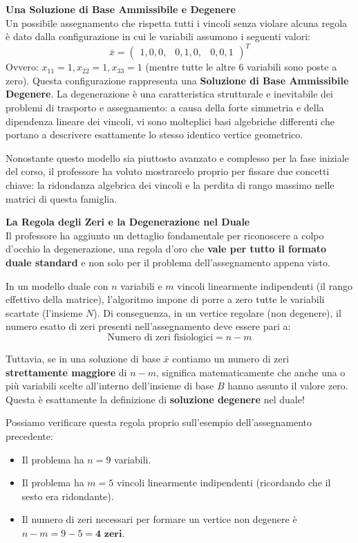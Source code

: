 \documentclass[12pt, a4paper]{article}
\begin{document}
	\vspace{0.3cm}
	\textbf{Una Soluzione di Base Ammissibile e Degenere}\\
	Un possibile assegnamento che rispetta tutti i vincoli senza violare alcuna regola è dato dalla configurazione in cui le variabili assumono i seguenti valori:
	\[
	\bar{x} = \begin{pmatrix} 1, 0, 0, & 0, 1, 0, & 0, 0, 1 \end{pmatrix}^T
	\]
	Ovvero: $x_{11}=1, x_{22}=1, x_{33}=1$ (mentre tutte le altre 6 variabili sono poste a zero).
	Questa configurazione rappresenta una \textbf{Soluzione di Base Ammissibile Degenere}. La degenerazione è una caratteristica strutturale e inevitabile dei problemi di trasporto e assegnamento: a causa della forte simmetria e della dipendenza lineare dei vincoli, vi sono molteplici basi algebriche differenti che portano a descrivere esattamente lo stesso identico vertice geometrico.
	
	Nonostante questo modello sia piuttosto avanzato e complesso per la fase iniziale del corso, il professore ha voluto mostrarcelo proprio per fissare due concetti chiave: la ridondanza algebrica dei vincoli e la perdita di rango massimo nelle matrici di questa famiglia.
	
	\vspace{0.4cm}
	\textbf{La Regola degli Zeri e la Degenerazione nel Duale}\\
	Il professore ha aggiunto un dettaglio fondamentale per riconoscere a colpo d'occhio la degenerazione, una regola d'oro che \textbf{vale per tutto il formato duale standard} e non solo per il problema dell'assegnamento appena visto.
	
	In un modello duale con $n$ variabili e $m$ vincoli linearmente indipendenti (il rango effettivo della matrice), l'algoritmo impone di porre a zero tutte le variabili scartate (l'insieme $N$). Di conseguenza, in un vertice regolare (non degenere), il numero esatto di zeri presenti nell'assegnamento deve essere pari a:
	\[
	\text{Numero di zeri fisiologici} = n - m
	\]
	
	Tuttavia, se in una soluzione di base $\bar{x}$ contiamo un numero di zeri \textbf{strettamente maggiore} di $n - m$, significa matematicamente che anche una o più variabili scelte all'interno dell'insieme di base $B$ hanno assunto il valore zero. Questa è esattamente la definizione di \textbf{soluzione degenere} nel duale!
	
	Possiamo verificare questa regola proprio sull'esempio dell'assegnamento precedente:
	\begin{itemize}[label=\textcolor{titlecolor}{\Large\textbullet}, itemsep=2pt, leftmargin=1.5cm]
		\item Il problema ha $n = 9$ variabili.
		\item Il problema ha $m = 5$ vincoli linearmente indipendenti (ricordando che il sesto era ridondante).
		\item Il numero di zeri necessari per formare un vertice non degenere è $n - m = 9 - 5 = \textbf{4 zeri}$.
	\end{itemize}
	
\end{document}
